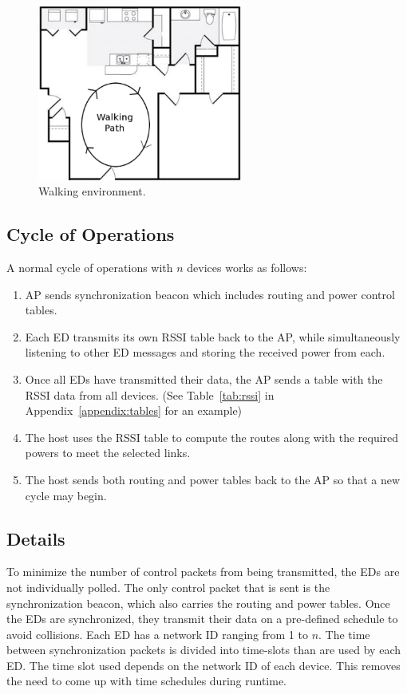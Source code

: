 \documentclass{article}
\begin{document}
\begin{figure}[!htb]
\begin{center}
\includegraphics[width=0.6\textwidth]{figures/floorplan.pdf}
\end{center}
\caption{Walking environment.}
\label{fig:floorplan}
\end{figure}

\subsection{Cycle of Operations}
A normal cycle of operations with $n$ devices works as follows:
\begin{enumerate}
\item AP sends synchronization beacon which includes routing and power control tables.
\item Each ED transmits its own RSSI table back to the AP, while simultaneously listening to other ED messages and storing the received power from each.
\item Once all EDs have transmitted their data, the AP sends a table with the RSSI data from all devices. (See Table~\ref{tab:rssi} in Appendix~\ref{appendix:tables} for an example)
\item The host uses the RSSI table to compute the routes along with the required powers to meet the selected links.
\item The host sends both routing and power tables back to the AP so that a new cycle may begin.
\end{enumerate}

\subsection{Details}
To minimize the number of control packets from being transmitted, the EDs are not individually polled. The only control packet that is sent is the synchronization beacon, which also carries the routing and power tables. Once the EDs are synchronized, they transmit their data on a pre-defined schedule to avoid collisions. Each ED has a network ID ranging from 1 to $n$. The time between synchronization packets is divided into time-slots than are used by each ED. The time slot used depends on the network ID of each device. This removes the need to come up with time schedules during runtime.
\end{document}
